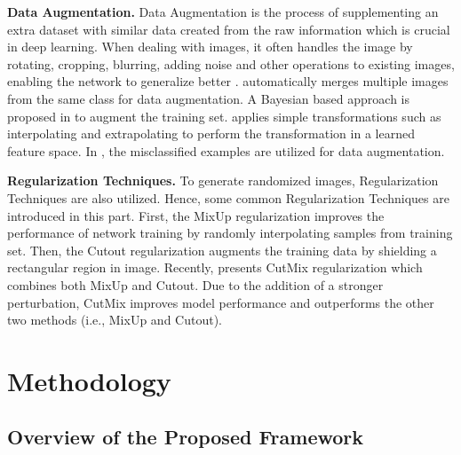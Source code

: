 \documentclass[twocolumn,journal,vlined,ruled,linesnumbered]{IEEEtran}
\begin{document}
\textbf{Data Augmentation.} Data Augmentation is the process of supplementing an extra dataset with similar data created from the raw information which is crucial in deep learning. When dealing with images, it often handles the image by rotating, cropping, blurring, adding noise and other operations to existing images, enabling the network to generalize better \cite{ciregan2012multi,sato2015apac,wan2013regularization,simard2003best}. \cite{lemley2017smart} automatically merges multiple images from the same class for data augmentation. A Bayesian based approach is proposed in \cite{tran2017bayesian} to augment the training set. \cite{devries2017dataset} applies simple transformations such as interpolating and extrapolating to perform the transformation in a learned feature space. In \cite{dreossi2018counterexample}, the misclassified examples are utilized for data augmentation.

\textbf{Regularization Techniques.} To generate randomized images, Regularization Techniques are also utilized. Hence, some common Regularization Techniques are introduced in this part. First, the MixUp regularization \cite{zhang2017mixup} improves the performance of network training by randomly interpolating samples from training set. Then, the Cutout regularization \cite{devries2017cutout} augments the training data by shielding a rectangular region in image. Recently, \cite{yun2019cutmix} presents CutMix regularization which combines both MixUp and Cutout. Due to the addition of a stronger perturbation, CutMix improves model performance and outperforms the other two methods (i.e., MixUp and Cutout).

\section{Methodology\label{sec:Methodology}}

\subsection{Overview of the Proposed Framework}
\end{document}
